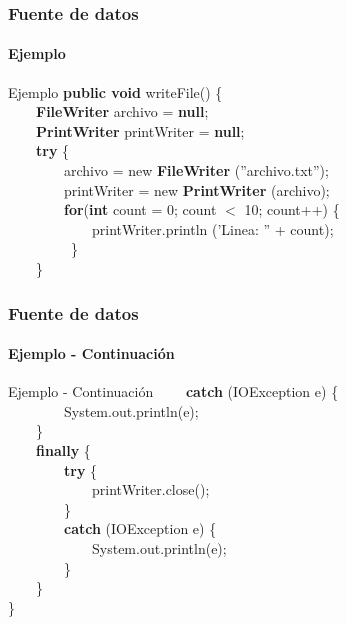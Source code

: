 \documentclass{beamer}
\begin{document}
		\begin{frame}
			\frametitle{Fuente de datos}
			\framesubtitle{Ejemplo}

			\begin{block}{Ejemplo}
			{\scriptsize
				\textbf{public void} writeFile() \{ \\
				\ \ \ \ \textbf{FileWriter} archivo = \textbf{null}; \\
			         \ \ \ \ \textbf{PrintWriter} printWriter = \textbf{null};\\
				\ \ \ \ \textbf{try} \{ \\
                       		\ \ \ \ \ \ \ \ archivo = new \textbf{FileWriter} (''archivo.txt''); \\
				\ \ \ \ \ \ \ \ printWriter = new \textbf{PrintWriter} (archivo); \\
				\ \ \ \ \ \ \ \ \textbf{for}(\textbf{int} count = 0; count $<$ 10; count++) \{ \\
				\ \ \ \ \ \ \ \ \ \ \ \ printWriter.println ('Linea: '' + count); \\
				\ \ \ \ \ \ \ \ \ \} \\
				\ \ \ \ \} \\
			}
			\end{block}
		\end{frame}

		\begin{frame}
			\frametitle{Fuente de datos}
			\framesubtitle{Ejemplo - Continuaci\'on}

			\begin{block}{Ejemplo  - Continuaci\'on}
			{\scriptsize
				\ \ \ \ \textbf{catch} (IOException e) \{ \\
                                     \ \ \ \ \ \ \ \ System.out.println(e); \\
                                     \ \ \ \ \} \\
                                     \ \ \ \ \textbf{finally} \{ \\
                                     \ \ \ \ \ \ \ \ \textbf{try} \{ \\
                                     \ \ \ \ \ \ \ \ \ \ \ \ printWriter.close(); \\
                                     \ \ \ \ \ \ \ \ \} \\
                                     \ \ \ \ \ \ \ \ \textbf{catch} (IOException e) \{ \\
                                     \ \ \ \ \ \ \ \ \ \ \ \ System.out.println(e); \\
                                     \ \ \ \ \ \ \ \ \}\\
                                     \ \ \ \ \} \\
                                     \}
			}
			\end{block}
		\end{frame}
\end{document}
